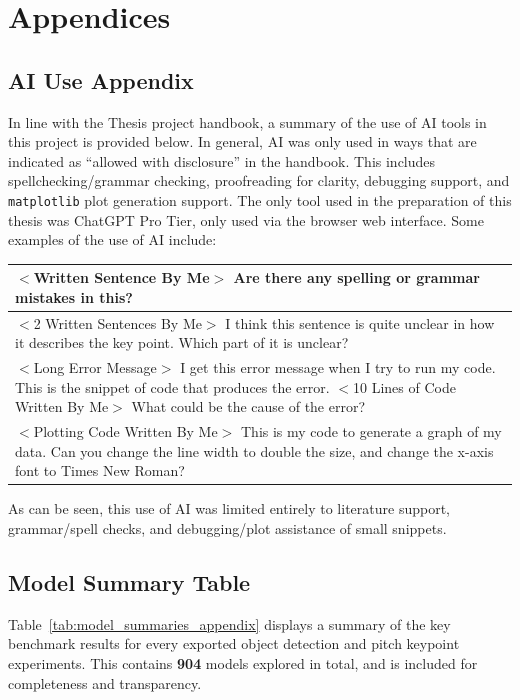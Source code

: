 \appendix
\section{Appendices}
\subsection{AI Use Appendix}

\newcommand{\promptslot}[1]{\textcolor{red!70!black}{\ensuremath{<}}\textcolor{red!70!black}{#1}\textcolor{red!70!black}{\ensuremath{>}}}

In line with the Thesis project handbook, a summary of the use of AI tools in this project is provided below. In general, AI was only used in ways that are indicated as ``allowed with disclosure'' in the handbook. This includes spellchecking/grammar checking, proofreading for clarity, debugging support, and \verb|matplotlib| plot generation support. The only tool used in the preparation of this thesis was ChatGPT Pro Tier, only used via the browser web interface. Some examples of the use of AI include:
\vspace{2em}
\begin{center}
\renewcommand{\arraystretch}{1.2}
\begin{tabularx}{0.95\linewidth}{X}
\promptslot{Written Sentence By Me} Are there any spelling or grammar mistakes in this? \\[1em]
\hline
\promptslot{2 Written Sentences By Me} I think this sentence is quite unclear in how it describes the key point. Which part of it is unclear? \\[1em]
\hline
\promptslot{Long Error Message} I get this error message when I try to run my code. This is the snippet of code that produces the error. \promptslot{10 Lines of Code Written By Me} What could be the cause of the error? \\[1em]
\hline
\promptslot{Plotting Code Written By Me} This is my code to generate a graph of my data. Can you change the line width to double the size, and change the x-axis font to Times New Roman? \\
\end{tabularx}
\end{center}



\vspace{2em}

As can be seen, this use of AI was limited entirely to literature support, grammar/spell checks, and debugging/plot assistance of small snippets. 

\newpage
\subsection{Model Summary Table}
\label{app:model_summary_csv}

Table~\ref{tab:model_summaries_appendix} displays a summary of the key benchmark results for every exported object detection and pitch keypoint experiments. This contains \textbf{904} models explored in total, and is included for completeness and transparency.


